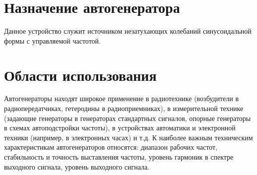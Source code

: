 
\usepackage{xcolor}
\usepackage{float}
\usepackage{hyperref}
\usepackage{tikz}
\usepackage{pgfplots}
\hypersetup{unicode=true}

\hypersetup{pdfstartview=FitH,  linkcolor=linkcolor,urlcolor=urlcolor, colorlinks=true}

	\sloppy
	\def\authors{Есюнин М.В., Есюнин Д.В.}
	\def\labnum{}
	\def\labname{Генератор гармонических колебаний}
	\def\sciadviser{Орлов И.Я.}
	\renewcommand{\vec}{\mathbf}
	\renewcommand{\phi}{\varphi}
	\renewcommand{\kappa}{\varkappa}
	\renewcommand{\Re}{\operatorname{Re}}
	\renewcommand{\Im}{\operatorname{Im}}
	
	\begin{spacing}{1.2}
		\tableofcontents
	\end{spacing}
	
	\newpage

\section{Назначение автогенератора}
Данное устройство служит источником незатухающих колебаний синусоидальной формы с управляемой частотой.

\section{Области использования}
Автогенераторы находят широкое применение в радиотехнике (возбудители в радиопередатчиках, гетеродины в радиоприемниках), в измерительной технике (задающие генераторы в генераторах стандартных сигналов, опорные генераторы в схемах автоподстройки частоты), в устройствах автоматики и электронной техники (например, в электронных часах) и т.д.
К наиболее важным техническим характеристикам автогенераторов относятся: диапазон рабочих частот, стабильность и точность выставления частоты, уровень гармоник в спектре выходного сигнала, уровень выходного сигнала.

